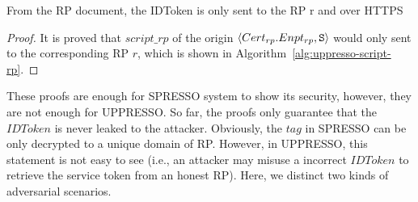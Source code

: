   \begin{lemma}\label{lemma:script-rp-to-rp} %
    From the RP document, the IDToken is only sent to the RP r 
    and over HTTPS
  \end{lemma}
  \begin{proof}
    It is proved that $script\_rp$ of the origin 
    $\langle Cert_{rp}.Enpt_{rp}, \mathtt{S}\rangle$ 
    would only sent to the corresponding RP $r$, 
    which is shown in Algorithm~\ref{alg:uppresso-script-rp}.
  \end{proof}
  
  These proofs are enough for SPRESSO system to show its 
  security, however, they are not enough for UPPRESSO. So far, 
  the proofs only guarantee that the $IDToken$ is never leaked 
  to the attacker. Obviously, the $tag$ in SPRESSO can be only 
  decrypted to a unique domain of RP. \newc However, in UPPRESSO, this 
  statement is not easy to see (i.e., an attacker may misuse a 
  incorrect $IDToken$ to retrieve the service token from an 
  honest RP). Here, we distinct two kinds of adversarial scenarios.\oldc

